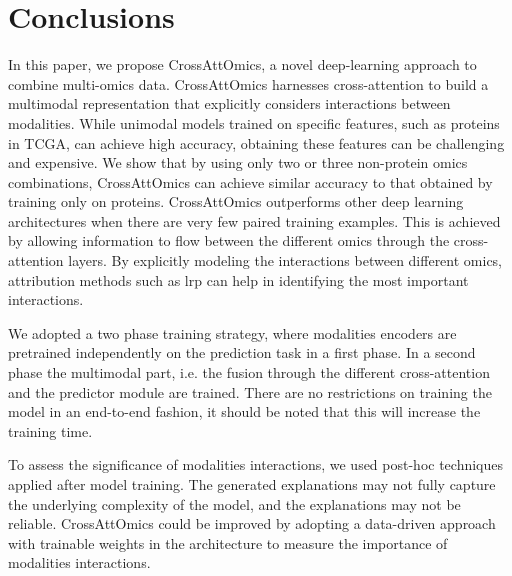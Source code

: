 \documentclass[../main.tex]{subfiles}
\begin{document}
\section{Conclusions}
	In this paper, we propose CrossAttOmics, a novel deep-learning approach to combine multi-omics data.
	CrossAttOmics harnesses cross-attention to build a multimodal representation that explicitly considers interactions between modalities.
	While unimodal models trained on specific features, such as proteins in TCGA, can achieve high accuracy, obtaining these features can be challenging and expensive.
	We show that by using only two or three non-protein omics combinations, CrossAttOmics can achieve similar accuracy to that obtained by training only on proteins.
	CrossAttOmics outperforms other deep learning architectures when there are very few paired training examples.
	This is achieved by allowing information to flow between the different omics through the cross-attention layers.
	By explicitly modeling the interactions between different omics, attribution methods such as \gls{lrp} can help in identifying the most important interactions.

	We adopted a two phase training strategy, where modalities encoders are pretrained independently on the prediction task in a first phase.
	In a second phase the multimodal part, i.e. the fusion through the different cross-attention and the predictor module are trained.
	There are no restrictions on training the model in an end-to-end fashion, it should be noted that this will increase the training time.

	To assess the significance of modalities interactions, we used post-hoc techniques applied after model training.
	The generated explanations may not fully capture the underlying complexity of the model, and the explanations may not be reliable.
	CrossAttOmics could be improved by adopting a data-driven approach with trainable weights in the architecture to measure the importance of modalities interactions.
\end{document}
